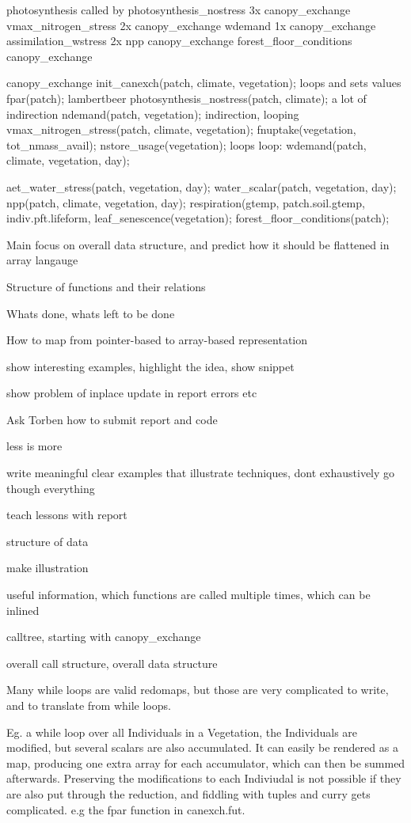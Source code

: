   photosynthesis
    called by
      photosynthesis_nostress 3x
        canopy_exchange
      vmax_nitrogen_stress 2x
        canopy_exchange
      wdemand 1x
        canopy_exchange
      assimilation_wstress 2x
        npp
          canopy_exchange
        forest_floor_conditions
          canopy_exchange

  canopy_exchange
    init_canexch(patch, climate, vegetation);
      loops and sets values
    fpar(patch);
      lambertbeer
    photosynthesis_nostress(patch, climate);
      a lot of indirection
    ndemand(patch, vegetation);
      indirection, looping
    vmax_nitrogen_stress(patch, climate, vegetation);
      fnuptake(vegetation, tot_nmass_avail);
      nstore_usage(vegetation);
      loops
    loop:
      wdemand(patch, climate, vegetation, day);

      aet_water_stress(patch, vegetation, day);
      water_scalar(patch, vegetation, day);
      npp(patch, climate, vegetation, day);
        respiration(gtemp, patch.soil.gtemp, indiv.pft.lifeform,
      leaf_senescence(vegetation);
    forest_floor_conditions(patch);



    Main focus on overall data structure, and predict how it should be flattened in array langauge

    Structure of functions and their relations

    Whats done, whats left to be done

    How to map from pointer-based to array-based representation

    show interesting examples, highlight the idea, show snippet

    show problem of inplace update in report
      errors etc

    Ask Torben how to submit report and code

    less is more

    write meaningful clear examples that illustrate techniques, dont exhaustively go though everything

    teach lessons with report

    structure of data

    make illustration

    useful information, which functions are called multiple times, which can be inlined

    calltree, starting with canopy_exchange

    overall call structure, overall data structure




    Many while loops are valid redomaps, but those are very complicated to write, and to translate from while loops.

    Eg. a while loop over all Individuals in a Vegetation, the Individuals are modified, but several scalars are also accumulated. It can easily be rendered as a map, producing one extra array for each accumulator, which can then be summed afterwards. Preserving the modifications to each Indiviudal is not  possible if they are also put through the reduction, and fiddling with tuples and curry gets complicated. e.g the fpar function in canexch.fut.

